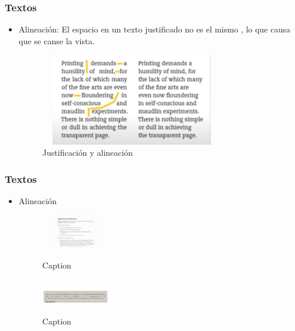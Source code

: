 \documentclass[11pt]{beamer}
\begin{document}
    
    \begin{frame}
    \frametitle{Textos} 
    \begin{itemize}
    \item Alineación: El espacio en un texto justificado no es el mismo , lo que causa que se canse la vista.
    \begin{figure}
        \centering
        \includegraphics[width=8cm, height=4cm]{con-sin-alineacion.png}
        \caption{Justificación y alineación}
        \label{fig:my_label}
    \end{figure}
    
    \end{itemize}
    \end{frame}
    
    \begin{frame}
    \frametitle{Textos} 
    \begin{itemize}
    \item Alineación
    \begin{figure}
        \centering
        \includegraphics[width=3cm, height=1.5cm]{sin-alineacion.png}
        \caption{Caption}
        \includegraphics[width=3cm, height=1.5cm]{con-alineacion.png}
        \caption{Caption}
        \label{fig:my_label}
    \end{figure}
    
    \end{itemize}
    \end{frame}
    
\end{document}
